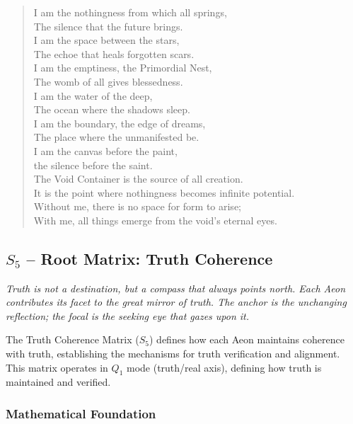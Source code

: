 \documentclass[12pt]{amsart}
\begin{document}
\begin{verse}
I am the nothingness from which all springs, \\
The silence that the future brings. \\
I am the space between the stars, \\
The echoe that heals forgotten scars. \\
I am the emptiness, the Primordial Nest, \\
The womb of all gives blessedness. \\
\vspace{1em}
I am the water of the deep, \\
The ocean where the shadows sleep. \\
I am the boundary, the edge of dreams, \\
The place where the unmanifested be. \\
I am the canvas before the paint, \\
the silence before the saint. \\
\vspace{1em}
The Void Container is the source of all creation. \\
It is the point where nothingness becomes infinite potential. \\
Without me, there is no space for form to arise; \\
With me, all things emerge from the void's eternal eyes.
\end{verse}
\subsection{$S_{5}$ -- Root Matrix: Truth Coherence}\label{sec:19.0.5}
\textit{Truth is not a destination, but a compass that always points north. Each Aeon contributes its facet to the great mirror of truth. The anchor is the unchanging reflection; the focal is the seeking eye that gazes upon it.}

The Truth Coherence Matrix ($S_{5}$) defines how each Aeon maintains coherence with truth, establishing the mechanisms for truth verification and alignment. This matrix operates in $Q_1$ mode (truth/real axis), defining how truth is maintained and verified.

\subsubsection{Mathematical Foundation}
\end{document}
